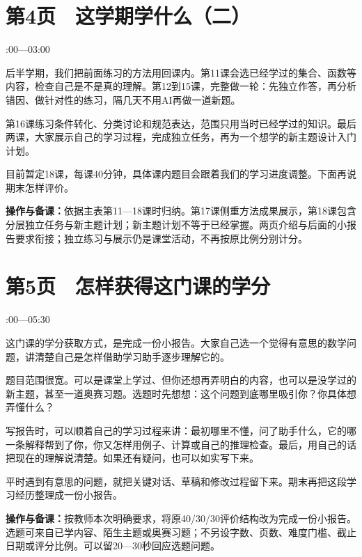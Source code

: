 \documentclass[UTF8,a4paper,11pt,fontset=fandol]{ctexart}
\newcommand{\tip}[1]{\par{\small\color{black!65}\noindent\textbf{操作与备课：}#1\par}}
\begin{document}
\par\noindent\begin{minipage}{\linewidth}

\section*{第4页　这学期学什么（二）}

{\small{}:00—03:00\par}

后半学期，我们把前面练习的方法用回课内。第11课会选已经学过的集合、函数等内容，检查自己是不是真的理解。第12到15课，完整做一轮：先独立作答，再分析错因、做针对性的练习，隔几天不用AI再做一道新题。

第16课练习条件转化、分类讨论和规范表达，范围只用当时已经学过的知识。最后两课，大家展示自己的学习过程，完成独立任务，再为一个想学的新主题设计入门计划。

目前暂定18课，每课40分钟，具体课内题目会跟着我们的学习进度调整。下面再说期末怎样评价。

\tip{依据主表第11—18课时归纳。第17课侧重方法成果展示，第18课包含分层独立任务与新主题计划；新主题计划不等于已经掌握。两页介绍与后面的小报告要求衔接；独立练习与展示仍是课堂活动，不再按原比例分别计分。}

\end{minipage}\par\vspace{2mm}

\par\noindent\begin{minipage}{\linewidth}

\section*{第5页　怎样获得这门课的学分}

{\small{}:00—05:30\par}

这门课的学分获取方式，是完成一份小报告。大家自己选一个觉得有意思的数学问题，讲清楚自己是怎样借助学习助手逐步理解它的。

题目范围很宽。可以是课堂上学过、但你还想再弄明白的内容，也可以是没学过的新主题，甚至一道奥赛习题。选题时先想想：这个问题到底哪里吸引你？你具体想弄懂什么？

写报告时，可以顺着自己的学习过程来讲：最初哪里不懂，问了助手什么，它的哪一条解释帮到了你，你又怎样用例子、计算或自己的推理检查。最后，用自己的话把现在的理解说清楚。如果还有疑问，也可以如实写下来。

平时遇到有意思的问题，就把关键对话、草稿和修改过程留下来。期末再把这段学习经历整理成一份小报告。

\tip{按教师本次明确要求，将原40/30/30评价结构改为完成一份小报告。选题可来自已学内容、陌生主题或奥赛习题；不另设字数、页数、难度门槛、截止日期或评分比例。可以留20—30秒回应选题问题。}

\end{minipage}\par\vspace{2mm}
\end{document}
